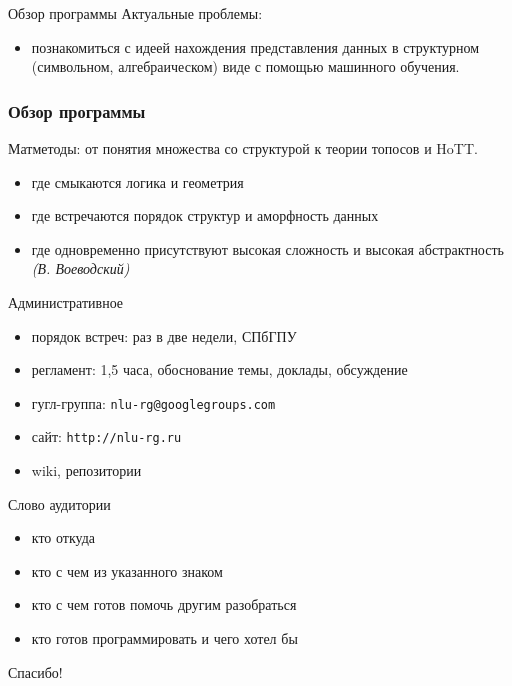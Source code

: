 \documentclass{beamer}
\begin{document}
\begin{frame}{Обзор программы}
Актуальные проблемы:\bigskip 
\begin{itemize}
  \item познакомиться с идеей нахождения представления данных в структурном (символьном, алгебраическом) виде с помощью машинного обучения.
\end{itemize}
\end{frame}

\begin{frame}[fragile]
\frametitle{Обзор программы}
Матметоды: от понятия множества со структурой к теории топосов и HoTT.\bigskip
\begin{itemize}
  \item где смыкаются логика и геометрия
  \item где встречаются порядок структур и аморфность данных
  \item где одновременно присутствуют высокая сложность и высокая абстрактность \textit{(В. Воеводский)}
\end{itemize}
\end{frame}

\begin{frame}{Административное}
\begin{itemize}
  \item порядок встреч: раз в две недели, СПбГПУ
  \item регламент: 1,5 часа, обоснование темы, доклады, обсуждение
  \item гугл-группа: \texttt{nlu-rg@googlegroups.com}
  \item сайт: \texttt{http://nlu-rg.ru}
  \item wiki, репозитории
\end{itemize}
\end{frame}

\begin{frame}{Слово аудитории}
\begin{itemize}
  \item кто откуда
  \item кто с чем из указанного знаком 
  \item кто с чем готов помочь другим разобраться
  \item кто готов программировать и чего хотел бы
\end{itemize}
\end{frame}

\begin{frame}{}
\thispagestyle{empty}
\begin{center}
{\large Спасибо!}
\end{center}
\end{frame}


\end{document}
